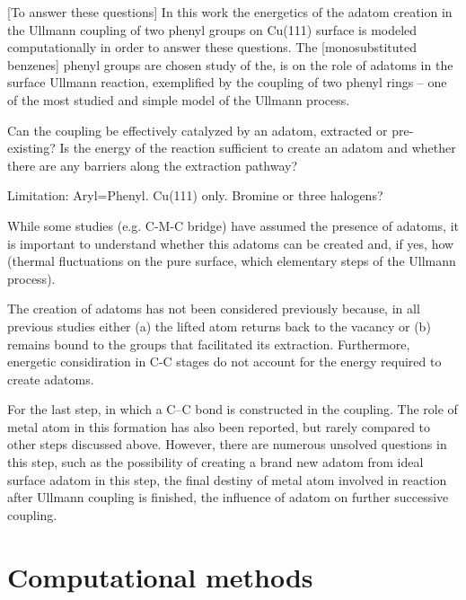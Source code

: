 \documentclass[%
 reprint,
 amsmath,amssymb,
 aps,
prb,
floatfix,
]{revtex4-2}
\newcommand{\lock}{\color{red}}
\newcommand{\lock}{\color{red}}
\newcommand{\comm}{\color{Purple}} %
\begin{document}
{\lock

[To answer these questions] In this work the energetics of the adatom creation in the Ullmann coupling of two phenyl groups on Cu(111) surface is modeled computationally in order to answer these questions. The [monosubstituted benzenes] phenyl groups are chosen study of the, is on the role of adatoms in the surface Ullmann reaction, exemplified by the coupling of two phenyl rings -- one of the most studied and simple model of the Ullmann process.

Can the coupling be effectively catalyzed by an adatom, extracted or pre-existing? Is the energy of the reaction sufficient to create an adatom and whether there are any barriers along the extraction pathway?

Limitation: Aryl=Phenyl. Cu(111) only. Bromine or three halogens? 


While some studies (e.g. C-M-C bridge) have assumed the presence of adatoms, it is important to understand whether this adatoms can be created and, if yes, how (thermal fluctuations on the pure surface, which elementary steps of the Ullmann process).

The creation of adatoms has not been considered previously because, in all previous studies either (a) the lifted atom returns back to the vacancy or (b) remains bound to the groups that facilitated its extraction. Furthermore, energetic considiration in C-C stages do not account for the energy required to create adatoms.

}

{\color{blue} 

For the last step, in which a C--C bond is constructed in the coupling. The role of metal atom in this formation has also been reported, but rarely compared to other steps discussed above. However, there are numerous unsolved questions in this step, such as the possibility of creating a brand new adatom from ideal surface adatom in this step, the final destiny of metal atom involved in reaction after Ullmann coupling is finished, the influence of adatom on further successive coupling.

}


\section{Computational methods}
\end{document}

